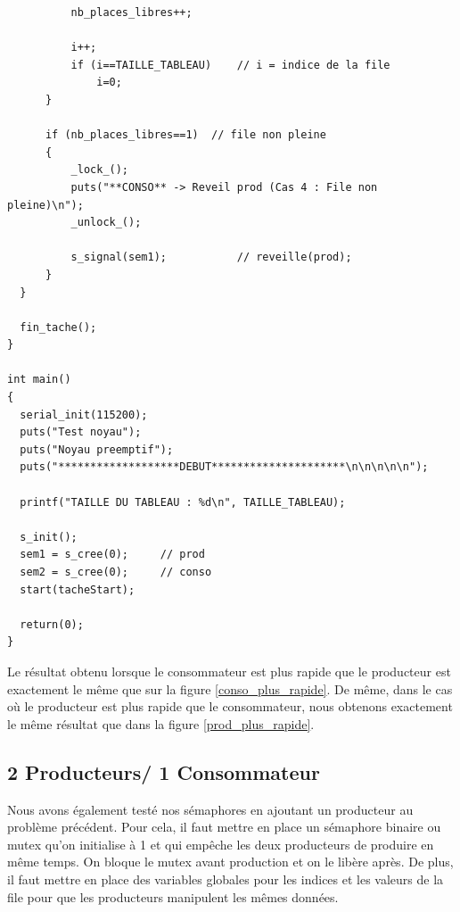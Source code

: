 \documentclass[a4paper,12pt]{report}
\begin{document}
\begin{lstlisting}
		  nb_places_libres++;

		  i++;
		  if (i==TAILLE_TABLEAU)	// i = indice de la file
			  i=0;
	  }

	  if (nb_places_libres==1)	// file non pleine
	  {
		  _lock_();
		  puts("**CONSO** -> Reveil prod (Cas 4 : File non pleine)\n");
		  _unlock_();

		  s_signal(sem1);			// reveille(prod);
	  }
  }

  fin_tache();
}

int main()
{
  serial_init(115200);
  puts("Test noyau");
  puts("Noyau preemptif");
  puts("*******************DEBUT*********************\n\n\n\n\n");

  printf("TAILLE DU TABLEAU : %d\n", TAILLE_TABLEAU);

  s_init();
  sem1 = s_cree(0);		// prod
  sem2 = s_cree(0);		// conso
  start(tacheStart);
	
  return(0);
}
\end{lstlisting}

Le résultat obtenu lorsque le consommateur est plus rapide que le producteur est exactement le même que sur la figure \ref{conso_plus_rapide}.
De même, dans le cas où le producteur est plus rapide que le consommateur, nous obtenons exactement le même résultat que dans la figure \ref{prod_plus_rapide}.\newline

\subsection{2 Producteurs/ 1 Consommateur}

Nous avons également testé nos sémaphores en ajoutant un producteur au problème précédent. Pour cela, il faut mettre en place un sémaphore binaire ou mutex qu'on initialise à 1 et qui empêche les deux producteurs de produire en même temps. On bloque le mutex avant production et on le libère après. De plus, il faut mettre en place des variables globales pour les indices et les valeurs de la file pour que les producteurs manipulent les mêmes données.\newline
\end{document}
